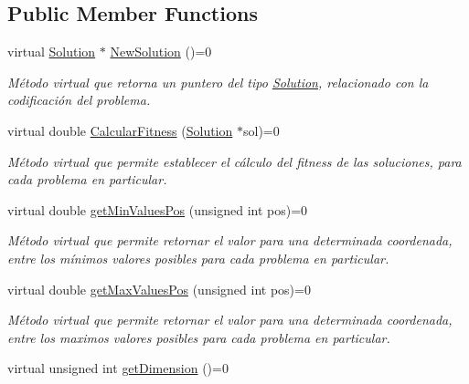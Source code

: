 \subsection*{Public Member Functions}
\begin{DoxyCompactItemize}
\item 
\hypertarget{class_problem_a4b9787b3945dbec08e402c0cfd0f646b}{virtual \hyperlink{class_solution}{Solution} $\ast$ \hyperlink{class_problem_a4b9787b3945dbec08e402c0cfd0f646b}{New\+Solution} ()=0}\label{class_problem_a4b9787b3945dbec08e402c0cfd0f646b}

\begin{DoxyCompactList}\small\item\em Método virtual que retorna un puntero del tipo \hyperlink{class_solution}{Solution}, relacionado con la codificación del problema. \end{DoxyCompactList}\item 
\hypertarget{class_problem_adc6176be667576d08cf3e89b65e905f4}{virtual double \hyperlink{class_problem_adc6176be667576d08cf3e89b65e905f4}{Calcular\+Fitness} (\hyperlink{class_solution}{Solution} $\ast$sol)=0}\label{class_problem_adc6176be667576d08cf3e89b65e905f4}

\begin{DoxyCompactList}\small\item\em Método virtual que permite establecer el cálculo del fitness de las soluciones, para cada problema en particular. \end{DoxyCompactList}\item 
\hypertarget{class_problem_ad6a122249b93487f91a64837a056fa75}{virtual double \hyperlink{class_problem_ad6a122249b93487f91a64837a056fa75}{get\+Min\+Values\+Pos} (unsigned int pos)=0}\label{class_problem_ad6a122249b93487f91a64837a056fa75}

\begin{DoxyCompactList}\small\item\em Método virtual que permite retornar el valor para una determinada coordenada, entre los mínimos valores posibles para cada problema en particular. \end{DoxyCompactList}\item 
\hypertarget{class_problem_a2ffe7de8658a25398d6a21dd1b2edfcb}{virtual double \hyperlink{class_problem_a2ffe7de8658a25398d6a21dd1b2edfcb}{get\+Max\+Values\+Pos} (unsigned int pos)=0}\label{class_problem_a2ffe7de8658a25398d6a21dd1b2edfcb}

\begin{DoxyCompactList}\small\item\em Método virtual que permite retornar el valor para una determinada coordenada, entre los maximos valores posibles para cada problema en particular. \end{DoxyCompactList}\item 
\hypertarget{class_problem_a6f72067600654aef0767bce95c4eacdd}{virtual unsigned int \hyperlink{class_problem_a6f72067600654aef0767bce95c4eacdd}{get\+Dimension} ()=0}\label{class_problem_a6f72067600654aef0767bce95c4eacdd}


\end{DoxyCompactItemize}
